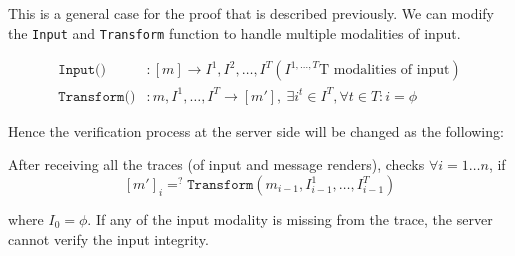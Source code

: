 This is a general case for the proof that is described previously. We can modify the \texttt{Input} and \texttt{Transform} function to handle multiple modalities of input. 

\begin{align*}
\texttt{Input()}&:[m]\rightarrow I^1, I^2, \ldots, I^T (I^{1,\ldots,T}\text{T modalities of input}) \\
\texttt{Transform()}&:m,I^1,\ldots, I^T \rightarrow [m'],\ \exists i^t\in I^T, \forall t \in T :i=\phi
\end{align*}

Hence the verification process at the server side will be changed as the following:

 After receiving all the traces (of input and message renders), \server checks $\forall i=1\ldots n$, if 
$$[m']_i =^? \texttt{Transform}(m_{i-1}, I^1_{i-1},\ldots, I^T_{i-1})$$ 

where $I_0=\phi$. If any of the input modality is missing from the trace, the server cannot verify the input integrity. 